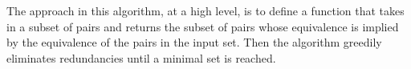 \documentclass[sigplan,review,anonymous]{acmart}
\begin{document}

    


The approach in this algorithm, at a high level, is to define a function that takes in a subset of pairs and returns the subset of pairs whose equivalence is implied by the equivalence of the pairs in the input set.
Then the algorithm greedily eliminates redundancies until a minimal set is reached.
\end{document}
